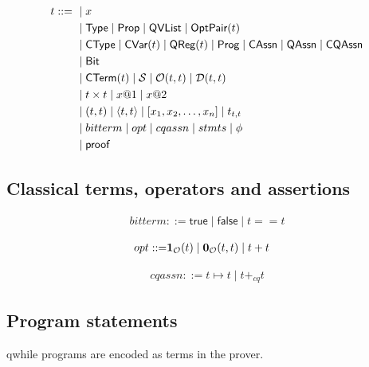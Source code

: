 \newcommand{\true}{\textsf{true}}
\newcommand{\false}{\textsf{false}}

\begin{definition}
    \begin{align*}
        t ::=\ & \mid x \\
        & \mid \textsf{Type} \mid \textsf{Prop} \mid \textsf{QVList} \mid \textsf{OptPair}(t) \\
        & \mid \textsf{CType} \mid \textsf{CVar}(t) \mid \textsf{QReg}(t) \mid \textsf{Prog} \mid \textsf{CAssn} \mid \textsf{QAssn} \mid \textsf{CQAssn} \\
        & \mid \textsf{Bit} \\
        & \mid \textsf{CTerm}(t) \mid \mathcal{S} \mid \mathcal{O}(t, t) \mid \mathcal{D}(t, t) \\
        & \mid t \times t \mid  x@1 \mid x@2 \\ 
        & \mid (t, t) \mid \langle t, t \rangle \mid [x_1, x_2, \dots, x_n] \mid t_{t,t} \\
        & \mid bitterm \mid opt \mid cqassn \mid stmts \mid \phi \\
        & \mid \textsf{proof}
    \end{align*}
\end{definition}

\subsection{Classical terms, operators and assertions}

\begin{definition}
    \begin{align*}
        bitterm ::= \true \mid \false \mid t == t
    \end{align*}
\end{definition}

\begin{definition}
    \begin{align*}
        opt ::= & \mathbf{1}_\mathcal{O}(t) \mid \mathbf{0}_\mathcal{O}(t,t) \mid t + t
    \end{align*}
\end{definition}

\begin{definition}
    \begin{align*}
        cqassn ::= t\mapsto t \mid t +_{cq} t
    \end{align*}
\end{definition}

\subsection{Program statements}
qwhile programs are encoded as terms in the prover.

